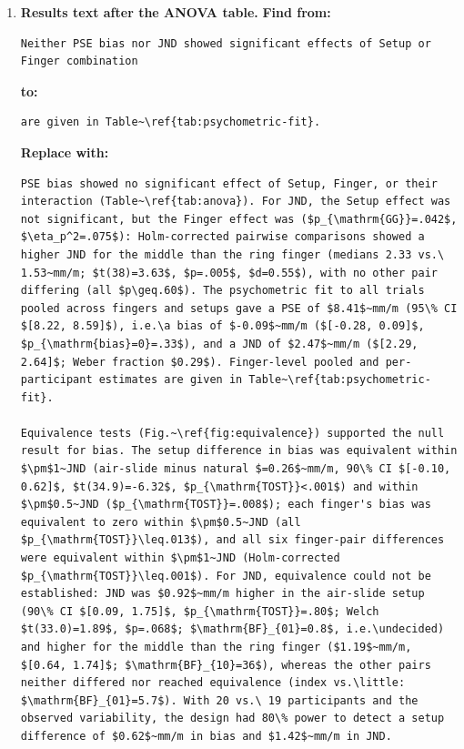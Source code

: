 \documentclass[11pt,a4paper]{article}
\newcommand{\replace}{\noindent\textbf{Replace with:}\par\nopagebreak}
\begin{document}
\begin{enumerate}[resume]
\item \textbf{Results text after the ANOVA table.}
\noindent\textbf{Find from:}\begin{lstlisting}
Neither PSE bias nor JND showed significant effects of Setup or Finger combination
\end{lstlisting}
\noindent\textbf{to:}\begin{lstlisting}
are given in Table~\ref{tab:psychometric-fit}.
\end{lstlisting}
\replace
\begin{lstlisting}
PSE bias showed no significant effect of Setup, Finger, or their interaction (Table~\ref{tab:anova}). For JND, the Setup effect was not significant, but the Finger effect was ($p_{\mathrm{GG}}=.042$, $\eta_p^2=.075$): Holm-corrected pairwise comparisons showed a higher JND for the middle than the ring finger (medians 2.33 vs.\ 1.53~mm/m; $t(38)=3.63$, $p=.005$, $d=0.55$), with no other pair differing (all $p\geq.60$). The psychometric fit to all trials pooled across fingers and setups gave a PSE of $8.41$~mm/m (95\% CI $[8.22, 8.59]$), i.e.\a bias of $-0.09$~mm/m ($[-0.28, 0.09]$, $p_{\mathrm{bias}=0}=.33$), and a JND of $2.47$~mm/m ($[2.29, 2.64]$; Weber fraction $0.29$). Finger-level pooled and per-participant estimates are given in Table~\ref{tab:psychometric-fit}.

Equivalence tests (Fig.~\ref{fig:equivalence}) supported the null result for bias. The setup difference in bias was equivalent within $\pm$1~JND (air-slide minus natural $=0.26$~mm/m, 90\% CI $[-0.10, 0.62]$, $t(34.9)=-6.32$, $p_{\mathrm{TOST}}<.001$) and within $\pm$0.5~JND ($p_{\mathrm{TOST}}=.008$); each finger's bias was equivalent to zero within $\pm$0.5~JND (all $p_{\mathrm{TOST}}\leq.013$), and all six finger-pair differences were equivalent within $\pm$1~JND (Holm-corrected $p_{\mathrm{TOST}}\leq.001$). For JND, equivalence could not be established: JND was $0.92$~mm/m higher in the air-slide setup (90\% CI $[0.09, 1.75]$, $p_{\mathrm{TOST}}=.80$; Welch $t(33.0)=1.89$, $p=.068$; $\mathrm{BF}_{01}=0.8$, i.e.\undecided) and higher for the middle than the ring finger ($1.19$~mm/m, $[0.64, 1.74]$; $\mathrm{BF}_{10}=36$), whereas the other pairs neither differed nor reached equivalence (index vs.\little: $\mathrm{BF}_{01}=5.7$). With 20 vs.\ 19 participants and the observed variability, the design had 80\% power to detect a setup difference of $0.62$~mm/m in bias and $1.42$~mm/m in JND.
\end{lstlisting}


\end{enumerate}
\end{document}
